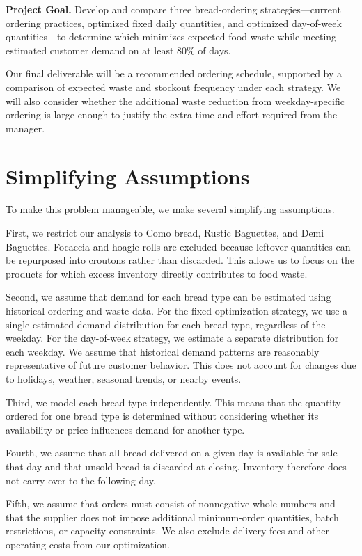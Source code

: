 \documentclass[11pt]{article}
\begin{document}
\noindent\textbf{Project Goal.} Develop and compare three bread-ordering strategies---current ordering practices, optimized fixed daily quantities, and optimized day-of-week quantities---to determine which minimizes expected food waste while meeting estimated customer demand on at least 80\% of days.

Our final deliverable will be a recommended ordering schedule, supported by a comparison of expected waste and stockout frequency under each strategy. We will also consider whether the additional waste reduction from weekday-specific ordering is large enough to justify the extra time and effort required from the manager.

\section{Simplifying Assumptions}

To make this problem manageable, we make several simplifying assumptions.

First, we restrict our analysis to Como bread, Rustic Baguettes, and Demi Baguettes. Focaccia and hoagie rolls are excluded because leftover quantities can be repurposed into croutons rather than discarded. This allows us to focus on the products for which excess inventory directly contributes to food waste.

Second, we assume that demand for each bread type can be estimated using historical ordering and waste data. For the fixed optimization strategy, we use a single estimated demand distribution for each bread type, regardless of the weekday. For the day-of-week strategy, we estimate a separate distribution for each weekday. We assume that historical demand patterns are reasonably representative of future customer behavior. This does not account for changes due to holidays, weather, seasonal trends, or nearby events.

Third, we model each bread type independently. This means that the quantity ordered for one bread type is determined without considering whether its availability or price influences demand for another type.

Fourth, we assume that all bread delivered on a given day is available for sale that day and that unsold bread is discarded at closing. Inventory therefore does not carry over to the following day.

Fifth, we assume that orders must consist of nonnegative whole numbers and that the supplier does not impose additional minimum-order quantities, batch restrictions, or capacity constraints. We also exclude delivery fees and other operating costs from our optimization.
\end{document}

